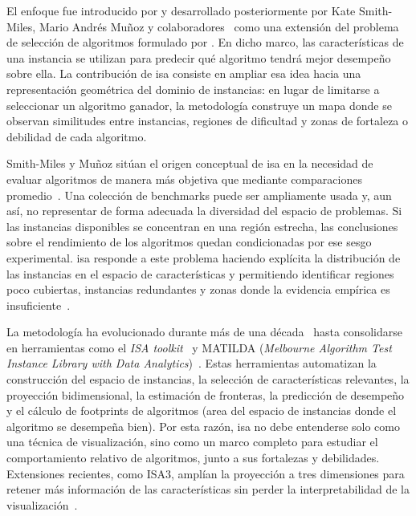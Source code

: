 El enfoque fue introducido por \textcite{smith-milesObjectiveMeasuresAlgorithm2014a}
y desarrollado posteriormente por Kate Smith-Miles, Mario Andrés Muñoz y
colaboradores~\parencite{smith-milesGeneratingNewTest2015,munozInstanceSpacesMachine2018a,smith-milesInstanceSpaceAnalysis2023a}
como una extensión del problema de selección de algoritmos formulado por
\textcite{riceAlgorithmSelectionProblem1976}. En dicho marco, las características de una instancia
se utilizan para predecir qué algoritmo tendrá mejor desempeño sobre ella. La contribución de
\acrshort{isa} consiste en ampliar esa idea hacia una representación geométrica del dominio de
instancias: en lugar de limitarse a seleccionar un algoritmo ganador, la metodología construye un
mapa donde se observan similitudes entre instancias, regiones de dificultad y zonas de fortaleza o
debilidad de cada algoritmo.

Smith-Miles y Muñoz sitúan el origen conceptual de \acrshort{isa} en la necesidad de evaluar
algoritmos de manera más objetiva que mediante comparaciones
promedio~\parencite{smith-milesObjectiveMeasuresAlgorithm2014a,smith-milesInstanceSpaceAnalysis2023a}. Una colección de
benchmarks puede ser ampliamente usada y, aun así, no representar de forma adecuada la
diversidad del espacio de problemas. Si las instancias disponibles se concentran en una región
estrecha, las conclusiones sobre el rendimiento de los algoritmos quedan condicionadas por ese
sesgo experimental. \acrshort{isa} responde a este problema haciendo explícita la distribución de
las instancias en el espacio de características y permitiendo identificar regiones poco cubiertas,
instancias redundantes y zonas donde la evidencia empírica es
insuficiente~\parencite{smith-milesGeneratingNewTest2015,munozInstanceSpacesMachine2018a}.

La metodología ha evolucionado durante más de una
década~\parencite{smith-milesObjectiveMeasuresAlgorithm2014a,smith-milesInstanceSpaceAnalysis2023a} hasta
consolidarse en herramientas como el \textit{ISA toolkit}~\parencite{munozAndremunInstanceSpaceFebruary2023a}
y MATILDA (\textit{Melbourne Algorithm Test Instance Library with Data
Analytics})~\parencite{smith-milesInstanceSpaceAnalysis2023a}. Estas herramientas automatizan la construcción del espacio de instancias, la
selección de características relevantes, la proyección bidimensional, la estimación de fronteras,
la predicción de desempeño y el cálculo de \glspl{footprint} de algoritmos (area del espacio de instancias 
donde el algoritmo se desempeña bien). Por esta razón,
\acrshort{isa} no debe entenderse solo como una técnica de visualización, sino como un marco
completo para estudiar el comportamiento relativo de algoritmos, junto a sus fortalezas y debilidades.
Extensiones recientes, como ISA3, amplían la proyección a tres dimensiones para retener más
información de las características sin perder la interpretabilidad de la
visualización~\parencite{simpsonISA33dimensionalExpansion2025}.

